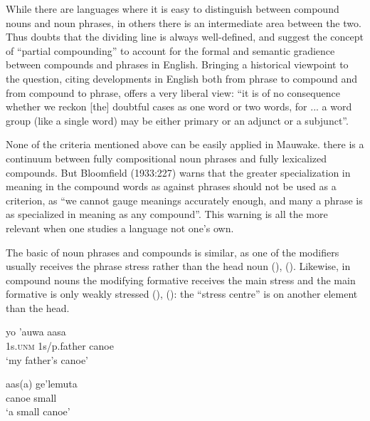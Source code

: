 While there are languages where it is easy to distinguish between compound nouns and noun phrases, in others there is an intermediate area between the two. Thus \citet[810]{Downing1977} doubts that the dividing line is always well-defined, and  \citet[1569]{QuirkEtAl1989} suggest the concept of ``partial compounding'' to account for the formal and semantic gradience between compounds and phrases in English. Bringing a historical viewpoint to the question, citing developments in English both from phrase to compound and from compound to phrase, \citet[102]{Jespersen1924} offers a very liberal view: ``it is of no consequence whether we reckon [the] doubtful cases as one word or two words, for ... a word group (like a single word) may be either primary or an adjunct or a subjunct''. 

None of the criteria mentioned above can be easily applied in Mauwake.  there is a continuum between fully compositional noun phrases and fully lexicalized compounds. But {Bloomfield} (1933:227) warns that the greater specialization in meaning in the compound words as against phrases should not be used as a criterion, as ``we cannot gauge meanings accurately enough, and many a phrase is as specialized in meaning as any compound''. This warning is all the more relevant when one studies a language not one's own. 

The basic  of noun phrases and compounds is similar, as one of the modifiers usually receives the phrase stress rather than the head noun (), (). Likewise, in compound nouns the modifying formative receives the main stress and the main formative is only weakly stressed (), (): the ``stress centre'' \citep[45]{Anderson1985a} is on another element than the head. 

\ea%
\label{ex:x29}
\gll yo 'auwa aasa\footnotemark{} \\
1s.\textsc{unm} 1s/p.father canoe\\
\glt`my father's canoe'
\z


\ea%
\label{ex:x30}
\gll aas(a) ge'lemuta \\
canoe small\\
\glt`a small canoe'
\z

